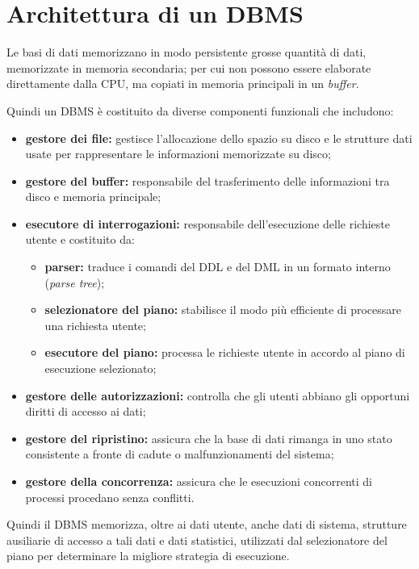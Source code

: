 \section{Architettura di un DBMS}%
\label{sec:Architettura di un DBMS}
Le basi di dati memorizzano in modo persistente grosse quantità di dati,
memorizzate in memoria secondaria; per cui non possono essere elaborate
direttamente dalla CPU, ma copiati in memoria principali in un \emph{buffer}.

Quindi un DBMS è costituito da diverse componenti funzionali che includono:
\begin{itemize}
  \item \textbf{gestore dei file:} gestisce l'allocazione dello spazio su disco
    e le strutture dati usate per rappresentare le informazioni memorizzate su
    disco;
  \item \textbf{gestore del buffer:} responsabile del trasferimento delle
    informazioni tra disco e memoria principale;
  \item \textbf{esecutore di interrogazioni:} responsabile dell'esecuzione delle
    richieste utente e costituito da:
    \begin{itemize}
      \item \textbf{parser:} traduce i comandi del DDL e del DML in un formato
        interno (\textit{parse tree});
      \item \textbf{selezionatore del piano:} stabilisce il modo più efficiente
        di processare una richiesta utente;
      \item \textbf{esecutore del piano:} processa le richieste utente in
        accordo al piano di esecuzione selezionato;
    \end{itemize}
  \item \textbf{gestore delle autorizzazioni:} controlla che gli utenti abbiano
    gli opportuni diritti di accesso ai dati;
  \item \textbf{gestore del ripristino:} assicura che la base di dati rimanga in
    uno stato consistente a fronte di cadute o malfunzionamenti del sistema;
  \item \textbf{gestore della concorrenza:} assicura che le esecuzioni
    concorrenti di processi procedano senza conflitti.
\end{itemize}

Quindi il DBMS memorizza, oltre ai dati utente, anche dati di sistema, strutture
ausiliarie di accesso a tali dati e dati statistici, utilizzati dal
selezionatore del piano per determinare la migliore strategia di esecuzione.

